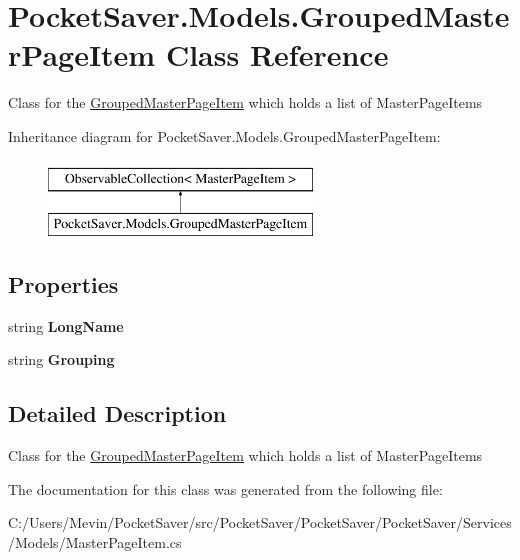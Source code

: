 \hypertarget{class_pocket_saver_1_1_models_1_1_grouped_master_page_item}{}\section{Pocket\+Saver.\+Models.\+Grouped\+Master\+Page\+Item Class Reference}
\label{class_pocket_saver_1_1_models_1_1_grouped_master_page_item}


Class for the \hyperlink{class_pocket_saver_1_1_models_1_1_grouped_master_page_item}{Grouped\+Master\+Page\+Item} which holds a list of Master\+Page\+Items  


Inheritance diagram for Pocket\+Saver.\+Models.\+Grouped\+Master\+Page\+Item\+:\begin{figure}[H]
\begin{center}
\leavevmode
\includegraphics[height=2.000000cm]{class_pocket_saver_1_1_models_1_1_grouped_master_page_item}
\end{center}
\end{figure}
\subsection*{Properties}
\begin{DoxyCompactItemize}
\item 
\mbox{\label{class_pocket_saver_1_1_models_1_1_grouped_master_page_item_a619204fd7ed3f9066387189fae76a98d}} 
string {\bfseries Long\+Name}
\item 
\mbox{\label{class_pocket_saver_1_1_models_1_1_grouped_master_page_item_a696caaaeb0bff26534f64905fa6e61be}} 
string {\bfseries Grouping}
\end{DoxyCompactItemize}


\subsection{Detailed Description}
Class for the \hyperlink{class_pocket_saver_1_1_models_1_1_grouped_master_page_item}{Grouped\+Master\+Page\+Item} which holds a list of Master\+Page\+Items 



The documentation for this class was generated from the following file\+:\begin{DoxyCompactItemize}
\item 
C\+:/\+Users/\+Mevin/\+Pocket\+Saver/src/\+Pocket\+Saver/\+Pocket\+Saver/\+Pocket\+Saver/\+Services/\+Models/Master\+Page\+Item.\+cs\end{DoxyCompactItemize}
